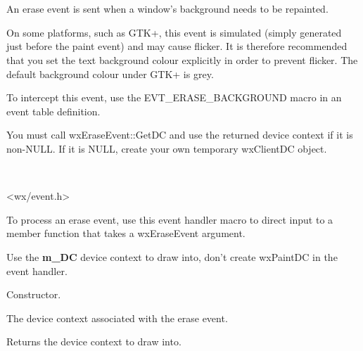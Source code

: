 \section{}\label{wxeraseevent}

An erase event is sent when a window's background needs to be repainted.

On some platforms, such as GTK+, this event is simulated (simply generated just before the
paint event) and may cause flicker. It is therefore recommended that
you set the text background colour explicitly in order to prevent flicker.
The default background colour under GTK+ is grey.

To intercept this event, use the EVT\_ERASE\_BACKGROUND macro in an event table definition.

You must call wxEraseEvent::GetDC and use the returned device context if it is non-NULL.
If it is NULL, create your own temporary wxClientDC object. 


\\


<wx/event.h>


To process an erase event, use this event handler macro to direct input to a member
function that takes a wxEraseEvent argument.

\twocolwidtha{7cm}
\begin{twocollist}\itemsep=0pt
\end{twocollist}%


Use the {\bf m\_DC} device context to draw into, don't create wxPaintDC in 
the event handler.




\label{wxeraseeventctor}


Constructor.

\label{wxeraseeventmdc}


The device context associated with the erase event.

\label{wxeraseeventgetdc}


Returns the device context to draw into.

